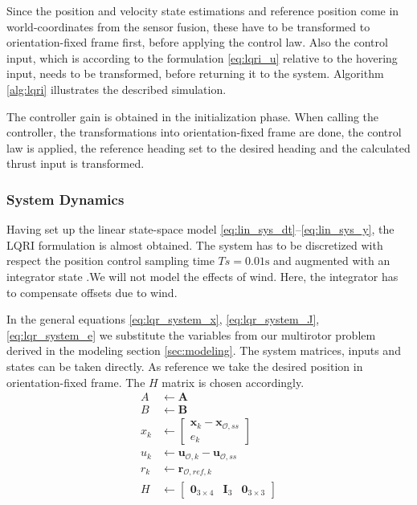 Since the position and velocity state estimations and reference position come in world-coordinates from the sensor fusion, these have to be transformed to orientation-fixed frame first, before applying the control law. Also the control input, which is according to the formulation \ref{eq:lqri_u} relative to the hovering input, needs to be transformed, before returning it to the system. Algorithm \ref{alg:lqri} illustrates the described simulation.

The controller gain is obtained in the initialization phase. When calling the controller, the transformations into orientation-fixed frame are done, the control law is applied, the reference heading set to the desired heading and the calculated thrust input is transformed.

\subsubsection{System Dynamics}
Having set up the linear state-space model \ref{eq:lin_sys_dt}--\ref{eq:lin_sys_y}, the LQRI formulation is almost obtained. The system has to be discretized with respect the position control sampling time $Ts=0.01\si{\second}$ and augmented with an integrator state .We will not model the effects of wind. Here, the integrator has to compensate offsets due to wind. 

In the general equations \ref{eq:lqr_system_x}, \ref{eq:lqr_system_J}, \ref{eq:lqr_system_e} we substitute the variables from our multirotor problem derived in the modeling section \ref{sec:modeling}. The system matrices, inputs and states can be taken directly. As reference we take the desired position in orientation-fixed frame. The $H$ matrix is chosen accordingly.
\begin{align}
{A} &\gets {\mathbf{A}} \\
{B} &\gets {\mathbf{B}} \\
x_k &\gets \begin{bmatrix}
{\mathbf{x}}_k - \mathbf{x}_{\mathcal{O},ss} \\
e_k
\end{bmatrix} \\
u_k &\gets {\mathbf{u}}_{\mathcal{O},k} - \mathbf{u}_{\mathcal{O},ss} \label{eq:lqri_u}\\
r_k &\gets \mathbf{r}_{\mathcal{O},ref,k} \\
{H} &\gets \begin{bmatrix}
\mathbf{0}_{3\times4} & \mathbf{I}_3 & \mathbf{0}_{3\times3}
\end{bmatrix} 
\end{align}


